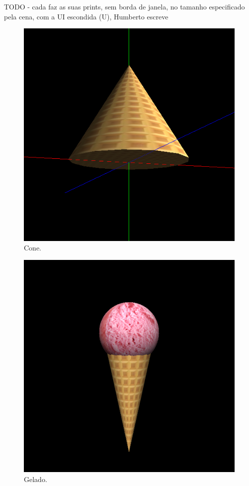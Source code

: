 \documentclass[12pt, a4paper]{article}
\begin{document}
{\color{red} TODO - cada faz as suas prints, sem borda de janela, no tamanho especificado pela cena,
com a UI escondida (U), Humberto escreve}

\begin{figure}[H]
    \centering
    \includegraphics[width=\textwidth]{res/phase4/Cone.png}
    \caption{Cone.}
\end{figure}

\begin{figure}[H]
    \centering
    \includegraphics[width=\textwidth]{res/phase4/IceCream.png}
    \caption{Gelado.}
\end{figure}
\end{document}
